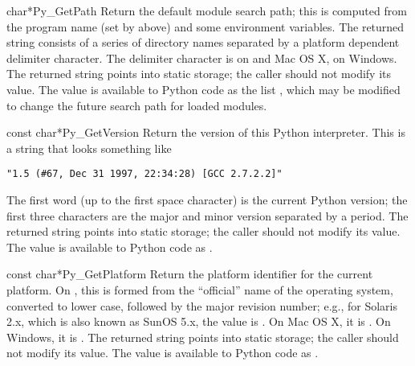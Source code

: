 \begin{cfuncdesc}{char*}{Py_GetPath}{}
  Return the default module search path; this is computed from the 
  program name (set by  above) and some
  environment variables.  The returned string consists of a series of
  directory names separated by a platform dependent delimiter
  character.  The delimiter character is \character{:} on \UNIX and Mac OS X,
  \character{;} on Windows.  The returned string points into
  static storage; the caller should not modify its value.  The value
  is available to Python code as the list
  , which
  may be modified to change the future search path for loaded
  modules.

\end{cfuncdesc}

\begin{cfuncdesc}{const char*}{Py_GetVersion}{}
  Return the version of this Python interpreter.  This is a string
  that looks something like

\begin{verbatim}
"1.5 (#67, Dec 31 1997, 22:34:28) [GCC 2.7.2.2]"
\end{verbatim}

  The first word (up to the first space character) is the current
  Python version; the first three characters are the major and minor
  version separated by a period.  The returned string points into
  static storage; the caller should not modify its value.  The value
  is available to Python code as .
\end{cfuncdesc}

\begin{cfuncdesc}{const char*}{Py_GetPlatform}{}
  Return the platform identifier for the current platform.  On \UNIX,
  this is formed from the ``official'' name of the operating system,
  converted to lower case, followed by the major revision number;
  e.g., for Solaris 2.x, which is also known as SunOS 5.x, the value
  is .  On Mac OS X, it is .  On Windows,
  it is .  The returned string points into static storage;
  the caller should not modify its value.  The value is available to
  Python code as .
\end{cfuncdesc}

